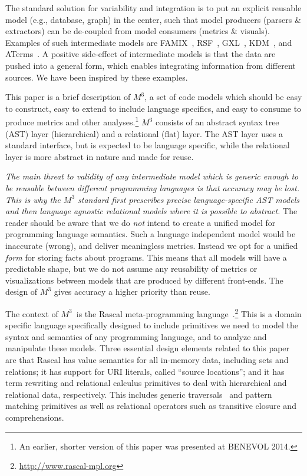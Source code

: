 \documentclass[conference]{IEEEtran}
\newcommand{\mthree}{\ensuremath{M^3}\xspace}
\begin{document}
The standard solution for variability and integration is to put an explicit
reusable model (e.g., database, graph) in the center, such that model
producers (parsers \& extractors) can be de-coupled from model consumers
(metrics \& visuals). Examples of such intermediate models are
FAMIX~\cite{famix}, RSF~\cite{Mueller88}, GXL~\cite{HWS00}, KDM~\cite{omg-kdm},
and ATerms~\cite{BJKO00}. A positive side-effect of intermediate models
is that the data are pushed into a general form, which enables integrating
information from different sources. We have been inspired by these examples.

This paper is a brief description of \mthree, a set of code models which
should be easy to construct, easy to extend to include language specifics, and
easy to consume to produce metrics and other analyses.\!\footnote{An earlier,
shorter version of this paper was presented at BENEVOL 2014.} \mthree consists of an abstract syntax tree (AST) layer
(hierarchical) and a relational (flat) layer. The AST layer uses a standard
interface, but is expected to be language specific, while the relational layer
is more abstract in nature and made for reuse.

\emph{The main threat to validity of any intermediate model which is generic
enough to be reusable between different programming languages is that accuracy
may be lost. This is why the \mthree standard first prescribes precise
language-specific AST models and then language agnostic relational models
where it is possible to abstract.} The reader should be aware that we do
\emph{not} intend to create a unified model for programming language
semantics. Such a language independent model would be inaccurate (wrong), and
deliver meaningless metrics. Instead we opt for a unified \emph{form} for
storing facts about programs. This means that all models will have a
predictable shape, but we do not assume any reusability of metrics or
visualizations between models that are produced by different front-ends. The
design of \mthree  gives accuracy a higher priority than reuse.



The context of \mthree\ is the Rascal meta-programming language~\cite{KvdSV-
Rascal11,rascalscam}.\footnote{\url{http://www.rascal-mpl.org}} This is a
domain specific language specifically designed to include primitives we need
to model the syntax and semantics of any programming language, and to analyze
and manipulate these models. Three essential design elements related to this
paper are that Rascal has value semantics for all in-memory data, including
sets and relations; it has support for URI literals, called ``source
locations''; and it has term rewriting and relational calculus primitives to
deal with hierarchical and relational data, respectively. This includes
generic traversals~\cite{Traversals} and pattern matching primitives as well
as relational operators such as transitive closure and comprehensions.
\end{document}
